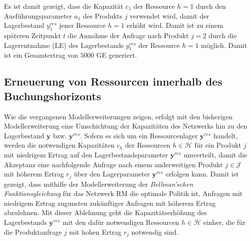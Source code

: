 Es ist damit gezeigt, dass die Kapazität $c_{1}$ der Ressource $h=1$ durch den Ausführungsparameter $a_{1}$ des Produkts $j$ verwendet wird, damit der Lagerbestand $y_{1}^{res}$ jener Ressource $h=1$ erhöht wird. Damit ist zu einem späteren Zeitpunkt $t$ die Annahme der Anfrage nach Produkt $j=2$ durch die Lagerentnahme (LE) des Lagerbestands $y_{1}^{res}$ der Ressource $h=1$ möglich. Damit ist ein Gesamtertrag von $5000$ GE generiert. 

\subsection{Erneuerung von Ressourcen innerhalb des Buchungshorizonts}

Wie die vergangenen Modellerweiterungen zeigen, erfolgt mit den bisherigen Modellerweiterung eine Umschichtung der Kapazitäten des Netzwerks hin zu den Lagerbestand $\textbf{y}$ bzw. $\textbf{y}^{res}$. Sofern es sich um ein Ressourcenlager $\textbf{y}^{res}$ handelt, werden die notwendigen Kapazitäten $c_{h}$ der Ressourcen $h\in\mathcal{H}$ für ein Produkt $j$ mit niedrigem Ertrag auf den Lagerbestandsparameter $\textbf{y}^{res}$ umverteilt, damit die Akzeptanz eine nachfolgende Anfrage nach einem anderweitigen Produkt $j\in\mathcal{J}$ mit höherem Ertrag $r_{j}$ über den Lagerparameter $\textbf{y}^{res}$ erfolgen kann. Damit ist gezeigt, dass mithilfe der Modellerweiterung der \textit{Bellman'schen Funktionsgleichung} für das Netzwerk RM die optimale Politik ist, Anfragen mit niedrigem Ertrag zugunsten zukünftiger Anfragen mit höherem Ertrag abzulehnen. Mit dieser Ablehnung geht die Kapazitätserhöhung des Lagerbestands $\textbf{y}^{res}$ mit den dafür notwendigen Ressourcen $h\in\mathcal{H}$ einher, die für die Produktanfrage $j$ mit hohen Ertrag $r_j$ notwendig sind.


